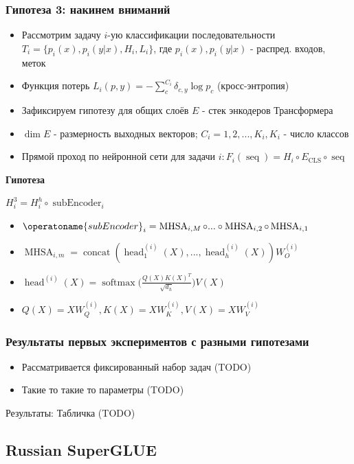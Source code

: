 \documentclass[aspectratio=169]{beamer}
\begin{document}
\begin{frame}
	\frametitle{Гипотеза 3: накинем вниманий}
	\begin{itemize}
		\item Рассмотрим задачу $i$-ую классификации последовательности $T_i = \{p_i(x), p_i(y | x), H_i, L_i\}$, где $p_i(x), p_i(y|x)$ - распред. входов, меток
		\item Функция потерь $L_i(p, y) = - \sum_{c}^{C_{i}} \delta_{c, y} \log p_c$ (кросс-энтропия)
		\item Зафиксируем гипотезу для общих слоёв $E$ - стек энкодеров Трансформера
		\item $\dim E$ - размерность выходных векторов; $C_i = {1, 2, ..., K_i}, K_i$ - число классов
		\item Прямой проход по нейронной сети для задачи $i: F_i(\operatorname{seq}) = H_i \circ E_{\operatorname{CLS}} \circ \operatorname{seq}$
	\end{itemize}

	\textbf{Гипотеза}

	$H_i^3 = H_{i}^{h} \circ \operatorname{subEncoder}_{i}$
	\begin{itemize}
		\item $\operatoname{subEncoder}_{i} = \operatorname{MHSA}_{i, M} \circ ... \circ \operatorname{MHSA}_{i, 2} \circ \operatorname{MHSA}_{i, 1}$
		\item $\operatorname{MHSA}_{i, m} = \operatorname{concat}(\operatorname{head}_1^{(i)}(X), ..., \operatorname{head}_h^{(i)}(X))W_{O}^{(i)}$
		\item $\operatorname{head}^{(i)}(X) = \operatorname{softmax} \Bigg ( \frac{Q(X)K(X)^T}{\sqrt{d_h}} \Bigg ) V(X)$
		\item $Q(X) = X W_{Q}^{(i)}, K(X) = X W_{K}^{(i)}, V(X) = X W_{V}^{(i)}$
	\end{itemize}
\end{frame}

\begin{frame}
	\frametitle{Результаты первых экспериментов с разными гипотезами}
	\begin{itemize}
		\item Рассматривается фиксированный набор задач (TODO)
		\item Такие то такие то параметры (TODO)
	\end{itemize}
	Результаты:
	Табличка (TODO)
\end{frame}

\subsection{Russian SuperGLUE}
\end{document}
